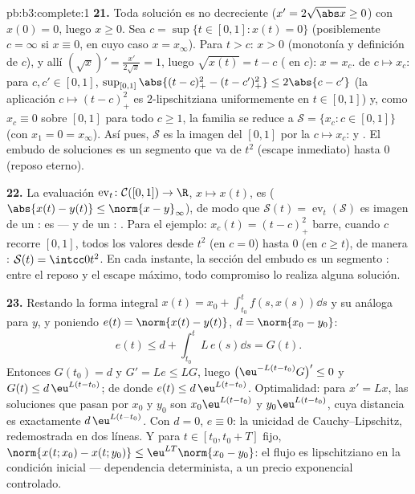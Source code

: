 \begin{solution}{pb:b3:complete:1}
\textbf{21.} Toda solución es no decreciente ($x' = 2\sqrt{\abs
x} \geq 0$) con $x(0) = 0$, luego $x \geq 0$. Sea $c =
\sup\{t \in [0,1] : x(t) = 0\}$ (posiblemente $c = \infty$ si
$x \equiv 0$, en cuyo caso $x = x_\infty$). Para $t > c$: $x
> 0$ (monotonía y definición de $c$), y allí $(\sqrt
x)' = \frac{x'}{2\sqrt x} = 1$, luego $\sqrt{x(t)} = t - c$
( en $c$): $x = x_c$.
 de $c \mapsto
x_c$: para $c, c' \in [0, 1]$, $\sup_{[0,1]}\abs{(t - c)_+^2 -
(t - c')_+^2} \leq 2\abs{c - c'}$ (la aplicación $c \mapsto
(t-c)_+^2$ es $2$-lipschitziana uniformemente en $t \in [0,1]$) y, como
$x_c \equiv 0$ sobre $[0,1]$ para todo $c \geq 1$, la familia se reduce
a $\mathcal S = \{x_c : c \in [0,1]\}$ (con $x_1 = 0 = x_\infty$). Así
pues, $\mathcal S$ es la imagen del
 $[0,1]$ por la
 $c
\mapsto x_c$:  y
. El embudo de soluciones es
un segmento  que va de
$t^2$ (escape inmediato) hasta $0$ (reposo eterno).

\textbf{22.} La evaluación $\operatorname{ev}_t\colon
\mathcal C([0,1]) \to \R$, $x \mapsto x(t)$, es
($\abs{x(t) - y(t)} \leq \norm{x - y}_\infty$), de modo que $\mathcal
S(t) = \operatorname{ev}_t(\mathcal S)$ es imagen
 de un
: es
 --- y de un
:
. Para el ejemplo:
$x_c(t) = (t - c)_+^2$ barre, cuando $c$ recorre $[0, 1]$, todos los
valores desde $t^2$ (en $c = 0$) hasta $0$ (en $c \geq t$), de manera
: $\mathcal S(t) =
\intcc0{t^2}$. En cada instante, la sección del embudo es un segmento
: entre el reposo y el escape máximo, todo compromiso lo realiza
alguna solución.

\textbf{23.} Restando la forma integral $x(t) = x_0 +
\int_{t_0}^tf(s, x(s))\dd s$ y su análoga para $y$, y poniendo
$e(t) = \norm{x(t) - y(t)}$, $d = \norm{x_0 - y_0}$:
\[
e(t) \leq d + \int_{t_0}^tL\,e(s)\dd s = G(t).
\]
Entonces $G(t_0) = d$ y $G' = Le \leq LG$, luego $\bigl(\eu^{-L(t
- t_0)}G\bigr)' \leq 0$ y $G(t) \leq d\,\eu^{L(t - t_0)}$; de donde
$e(t) \leq d\,\eu^{L(t-t_0)}$. Optimalidad: para $x' =
Lx$, las soluciones que pasan por $x_0$ y $y_0$ son $x_0\eu^{L(t -
t_0)}$ y $y_0\eu^{L(t-t_0)}$, cuya distancia es exactamente
$d\,\eu^{L(t-t_0)}$. Con $d = 0$, $e \equiv 0$: la unicidad de
Cauchy--Lipschitz, redemostrada en dos líneas. Y para
$t \in [t_0, t_0 + T]$ fijo, $\norm{x(t; x_0) - x(t;
y_0)} \leq \eu^{LT}\norm{x_0 - y_0}$: el flujo es lipschitziano en la
condición inicial --- dependencia determinista, a un precio exponencial
controlado.


\end{solution}
